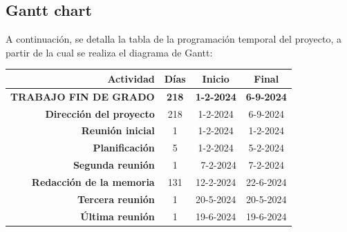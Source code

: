  \subsection{Gantt chart}

  A continuación, se detalla la tabla de la programación temporal del proyecto, a partir de la cual se realiza el diagrama de Gantt:

  \begin{table}[!h]
    \centering
    \begin{tabular}{|r|c|c|c|}
    \hline
    \rowcolor[HTML]{CBCEFB} 
    \textbf{Actividad}                                           & \textbf{Días}             & \textbf{Inicio}                   & \textbf{Final}                    \\ \hline
    \rowcolor[HTML]{FFCCC9} 
    \textbf{TRABAJO FIN DE GRADO}                                & \textbf{218}              & \textbf{1-2-2024}                 & \textbf{6-9-2024}                \\ \hline
    \rowcolor[HTML]{FFCE93} 
    \textbf{Dirección del proyecto}                              & 218                       & 1-2-2024                          & 6-9-2024                         \\ \hline
    \rowcolor[HTML]{CBE5CB} 
    \textbf{Reunión inicial}                                     & 1                         & 1-2-2024                          & \cellcolor[HTML]{CBE5CB}1-2-2024  \\ \hline
    \rowcolor[HTML]{CBE5CB} 
    \textbf{Planificación}                                       & 5                         & \cellcolor[HTML]{CBE5CB}1-2-2024  & \cellcolor[HTML]{CBE5CB}5-2-2024  \\ \hline
    \rowcolor[HTML]{CBE5CB} 
    \textbf{Segunda reunión} &
      \cellcolor[HTML]{CBE5CB}1 &
      \multicolumn{1}{r|}{\cellcolor[HTML]{CBE5CB}7-2-2024} &
      \cellcolor[HTML]{CBE5CB}7-2-2024 \\ \hline
    \rowcolor[HTML]{CBE5CB} 
    \cellcolor[HTML]{CBE5CB}\textbf{Redacción de la memoria}     & 131                       & 12-2-2024                         & 22-6-2024                         \\ \hline
    \rowcolor[HTML]{CBE5CB} 
    \textbf{Tercera reunión}                                     & 1                         & 20-5-2024                         & \cellcolor[HTML]{CBE5CB}20-5-2024 \\ \hline
    \rowcolor[HTML]{CBE5CB} 
    \textbf{Última reunión}                                      & 1                         & 19-6-2024                         & 19-6-2024                         \\ \hline

\end{tabular}
\end{table}
